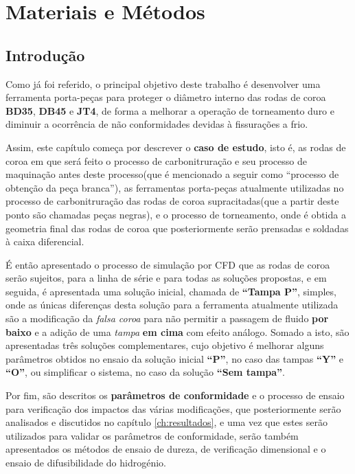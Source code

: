 \chapter{Materiais e Métodos} \label{ch:materiais}
\setlength{\headheight}{13.6pt}
\section{Introdução} \label{sec:materiais_intro}
Como já foi referido, o principal objetivo deste trabalho é desenvolver uma ferramenta porta-peças para proteger o diâmetro interno das rodas de coroa \textbf{BD35}, \textbf{DB45} e \textbf{JT4}, de forma a melhorar a operação de torneamento duro e diminuir a ocorrência de não conformidades devidas à fissurações a frio. 
\par
Assim, este capítulo começa por descrever o \textbf{caso de estudo}, isto é, as rodas de coroa em que será feito o processo de carbonitruração e seu processo de maquinação antes deste processo(que é mencionado a seguir como “processo de obtenção da peça branca”), as ferramentas porta-peças atualmente utilizadas no processo de carbonitruração das rodas de coroa supracitadas(que a partir deste ponto são chamadas peças negras), e o processo de torneamento, onde é obtida a geometria final das rodas de coroa que posteriormente serão prensadas e soldadas à caixa diferencial.
\par
É então apresentado o processo de simulação por CFD que as rodas de coroa serão sujeitos, para a linha de série e para todas as soluções propostas, e em seguida, é apresentada uma solução inicial, chamada de \textbf{“Tampa P”}, simples, onde as únicas diferenças desta solução para a ferramenta atualmente utilizada são a modificação da \textit{falsa coroa} para não permitir a passagem de fluido \textbf{por baixo} e a adição de uma \textit{tampa} \textbf{em cima} com efeito análogo. Somado a isto, são apresentadas três soluções complementares, cujo objetivo é melhorar alguns parâmetros obtidos no ensaio da solução inicial \textbf{“P”}, no caso das tampas \textbf{“Y”} e \textbf{“O”}, ou simplificar o sistema, no caso da solução \textbf{“Sem tampa”}.
\par
Por fim, são descritos os \textbf{parâmetros de conformidade} e o processo de ensaio para verificação dos impactos das várias modificações, que posteriormente serão analisados e discutidos no capítulo \ref{ch:resultados}, e uma vez que estes serão utilizados para validar os parâmetros de conformidade, serão também apresentados os métodos de ensaio de dureza, de verificação dimensional e o ensaio de difusibilidade do hidrogénio.
\newpage
